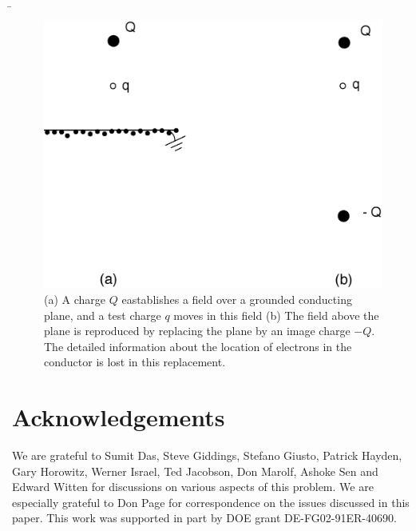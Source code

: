 \documentclass[11pt]{article}
\begin{document}
\b

\begin{figure}[htbp]
\begin{center}
\includegraphics[scale=.35]{fn10.eps}
\caption{{(a) A charge $Q$ eastablishes a field over a grounded conducting plane, and a test charge $q$ moves in this field (b) The field above the plane is reproduced by replacing the plane by an image charge $-Q$. The detailed information about the location of electrons in the conductor is lost in this replacement.}}
\label{fn10}
\end{center}
\end{figure}




\section*{Acknowledgements}

We are grateful to Sumit Das, Steve Giddings, Stefano Giusto, Patrick Hayden, Gary Horowitz, Werner Israel, Ted Jacobson, Don Marolf,   Ashoke Sen and Edward Witten for discussions on various aspects of this problem.  We are especially grateful to Don Page for  correspondence on the issues discussed in this paper. This  work was supported in part by DOE grant DE-FG02-91ER-40690.
\end{document}
